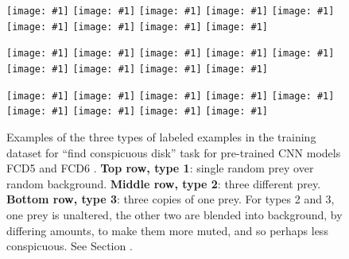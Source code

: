 \documentclass[letterpaper]{article}
\newcommand{\ignine}[1]{\texttt{[image: \#1]}}
\begin{document}


\begin{figure}[t]
    \begin{minipage}{\linewidth}
    \ignine{20220303_UVSfqCzewt_38_20.png}
    \hfill
    \ignine{20220303_SBWaLRHOzk_56_33.png}
    \hfill
    \ignine{20220303_bUMqcbutgJ_25_78.png}
    \hfill
    \ignine{20220303_HZzUzWWqcC_54_28.png}
    \hfill
    \ignine{20220303_inuPKUxnHQ_72_71.png}
    \hfill
    \ignine{20220303_RRGCwhmcJc_101_84.png}
    \hfill
    \ignine{20220303_PYinyJAWaj_61_60.png}
    \hfill
    \ignine{20220303_TNXfhQtzYa_92_91.png}
    \hfill
    \ignine{20220303_cDMtFaTYKk_63_54.png}
    \end{minipage}
    \begin{minipage}{\linewidth}
    \vspace{0.1cm}
    \ignine{20220303_wIRPERwSCh_49_63.png}
    \hfill
    \ignine{20220303_edDsCjbHdf_61_92.png}
    \hfill
    \ignine{20220303_fGMFBgMQDX_93_86.png}
    \hfill
    \ignine{20220303_jQREPLQyuL_33_39.png}
    \hfill
    \ignine{20220303_ijBOHTccYX_104_101.png}
    \hfill
    \ignine{20220303_KAoOFAqFyU_80_58.png}
    \hfill
    \ignine{20220303_NExMwxEbzU_85_92.png}
    \hfill
    \ignine{20220303_kpcUyhHXOh_91_98.png}
    \hfill
    \ignine{20220303_oWPwPGkcSb_82_22.png}
    \end{minipage}
    \begin{minipage}{\linewidth}
    \vspace{0.1cm}
    \ignine{20220303_uAEPxMZbeo_83_45.png}
    \hfill
    \ignine{20220303_cADfBauZUV_47_32.png}
    \hfill
    \ignine{20220303_YAMfudJxeH_30_84.png}
    \hfill
    \ignine{20220303_JeyBgDfMcN_40_82.png}
    \hfill
    \ignine{20220303_OaOJaByhbU_90_55.png}
    \hfill
    \ignine{20220303_mhYpDjxaKf_78_57.png}
    \hfill
    \ignine{20220303_ASsEgFUlly_23_60.png}
    \hfill
    \ignine{20220303_nzgItDrYqT_71_99.png}
    \hfill
    \ignine{20220303_QuHYtnPora_72_73.png}
    \end{minipage}
    \caption{Examples of the three types of labeled examples in the training dataset for “find conspicuous disk” task for  pre-trained CNN models FCD5 and FCD6 \citep{reynolds_FCD6_2022}. \textbf{Top row, type 1}: single random prey over random background. \textbf{Middle row, type 2}: three different prey. \textbf{Bottom row, type 3}: three copies of one prey. For types 2 and 3, one prey is unaltered, the other two are blended into background, by differing amounts, to make them more muted, and so perhaps less conspicuous. See Section .}
    \label{fig:fcd5_examples}
\end{figure}
\end{document}
